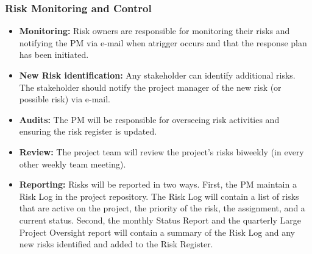 \documentclass[a4paper, 11pt]{article}
\begin{document}
\subsubsection{Risk Monitoring and Control}
\begin{itemize}
\item \textbf{Monitoring:} Risk owners are responsible for monitoring their risks and notifying the PM via e-mail when atrigger occurs and that the response plan has been initiated.
\item \textbf{New Risk identification:} Any stakeholder can identify additional risks. The stakeholder should notify the project manager of the new risk (or possible risk) via e-mail.
\item \textbf{Audits:} The PM will be responsible for overseeing risk activities and ensuring the risk register is updated.
\item \textbf{Review:} The project team will review the project's risks biweekly (in every other weekly team meeting).
\item \textbf{Reporting:} Risks will be reported in two ways. First, the PM maintain a Risk Log in the project repository. The Risk Log will contain a list of risks that are active on the project, the priority of the risk, the assignment, and a current status. Second, the monthly Status Report and the quarterly Large Project Oversight report will contain a summary of the Risk Log and any new risks identified and added to the Risk Register.
\end{itemize}
\end{document}
